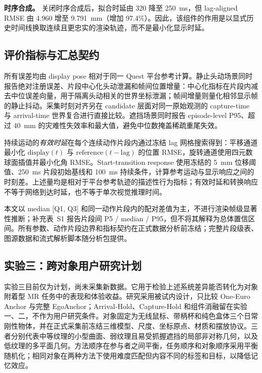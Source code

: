 \documentclass[review]{vgtc}
\begin{document}
\textbf{时序合成。}
关闭时序合成后，拟合时延由 320 降至 250~ms，但 lag-aligned RMSE 由 4.960 增至 9.791~mm（增加 97.4\%）。因此，该组件的作用是以显式历史时间线换取连续且更忠实的渲染轨迹，而不是最小化显示时延。
\FloatBarrier

\subsection{评价指标与汇总契约}

所有误差均由 display pose 相对于同一 Quest 平台参考计算。静止头动场景同时报告绝对注册误差、片段中心化头动泄漏和帧间位置增量：中心化指标在片段内减去中位误差向量，用于隔离头动相关的世界坐标泄漏；帧间增量则量化相邻显示帧的静止抖动。采集时刻对齐另在 candidate 层面对同一原始观测的 capture-time 与 arrival-time 世界复合进行直接比较。遮挡场景同时报告 episode-level P95、超过 40~mm 的灾难性失效率和最大值，避免中位数掩盖稀疏重尾失效。

持续运动的\emph{有效时延}在每个连续动作片段内通过冻结 lag 网格搜索得到：平移通道最小化 $\mathrm{display}(t)$ 与 $\mathrm{reference}(t-\mathrm{lag})$ 的位置 RMSE，旋转通道使用四元数球面插值并最小化角 RMSE。Start-transition response 使用冻结的 5~mm 位移阈值、250~ms 片段初始基线和 100~ms 持续条件，计算参考运动与显示响应之间的时刻差。上述量均是相对于平台参考轨迹的描述性行为指标；有效时延和转换响应不等于网络到达时延，也不等于单次视觉推理时间。

本文以 median [Q1, Q3] 和同一动作片段内的配对差值为主，不进行渲染帧级显著性推断；补充表~S1 报告片段间 P5 / median / P95，但不将其解释为总体置信区间。所有参数、动作片段边界和指标契约在正式数据分析前冻结；完整片段级表、图源数据和流式解析脚本随分析包提供。

\subsection{实验三：跨对象用户研究计划}

实验三目前仅为计划，尚未采集新数据。它用于检验上述系统差异能否转化为对象附着型 MR 任务中的表现和体验收益。研究采用被试内设计，只比较 One-Euro Anchor 与完整 EgoAnchor；Arrival-Hold、Capture-Hold 和组件消融留在实验一、二，不作为用户研究条件。对象固定为无线鼠标、带柄杯和纯色盒体三个日常刚性物体，并在正式采集前冻结三维模型、尺度、坐标原点、材质和摆放协议。三者分别代表中等纹理的小型曲面、弱纹理且易受抓握遮挡的局部非对称几何，以及低纹理的多平面几何。方法顺序在参与者之间平衡，任务顺序和对象顺序采用平衡随机化；相同对象在两种方法下使用难度匹配但内容不同的标签和目标，以降低记忆效应。
\end{document}
